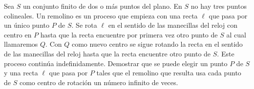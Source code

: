 Sea $S$ un conjunto finito de dos o más puntos del plano. En $S$ no hay tres puntos colineales. Un remolino es un proceso que empieza con una recta $\ell$ que pasa por un único punto $P$ de $S$. Se rota $\ell$ en el sentido de las manecillas del reloj con centro en $P$ hasta que la recta encuentre por primera vez otro punto de $S$ al cual llamaremos $Q$. Con $Q$ como nuevo centro se sigue rotando la recta en el sentido de las manecillas del reloj hasta que la recta encuentre otro punto de $S$. Este proceso continúa indefinidamente. \newline 
Demostrar que se puede elegir un punto $P$ de $S$ y una recta $\ell$ que pasa por $P$ tales que el remolino que resulta usa cada punto de $S$ como centro de rotación un número infinito de veces.